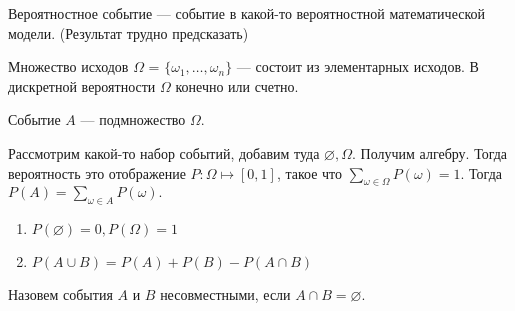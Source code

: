 Вероятностное событие --- событие в какой-то вероятностной математической модели. (Результат трудно предсказать)

Множество исходов $\Omega$ =  $\{\omega_1, \ldots, \omega_n\}$ --- состоит из элементарных исходов. В дискретной вероятности $\Omega$ конечно или счетно. 

Событие $A$ --- подмножество  $\Omega$. 

Рассмотрим какой-то набор событий, добавим туда  $\varnothing, \Omega$. Получим алгебру. Тогда вероятность это отображение  $P: \Omega \mapsto [0, 1]$, такое что  $\sum_{\omega \in \Omega} P(\omega)=1$. Тогда  $P(A) = \sum_{\omega \in A} P(\omega).$
\begin{enumerate}[label=Свойства]
    \item $P(\varnothing) = 0, P(\Omega) = 1$
    \item  $P(A \cup B) = P(A) + P(B) - P(A \cap B)$
\end{enumerate}
 \begin{definition}
    Назовем события $A$ и  $B$ несовместными, если  $A \cap B = \varnothing$.
\end{definition}
